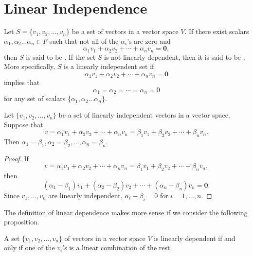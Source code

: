  
\section{Linear Independence}
 

Let $S = \{v_1, v_2, \ldots, v_n\}$ be a set of vectors in a vector
space $V$. If there exist scalars $\alpha_1, \alpha_2 \ldots \alpha_n
\in F$ such that not all of the $\alpha_i$'s are zero and 
\[
\alpha_1 v_1 + \alpha_2 v_2 + \cdots + \alpha_n v_n = {\mathbf 0 },
\]
then $S$ is said to be . If the set $S$ is not linearly
dependent, then it is said to be . More specifically, $S$ is a
linearly independent set if
\[ 
\alpha_1 v_1 + \alpha_2 v_2 + \cdots + \alpha_n v_n = {\mathbf 0 }
\]
implies that
\[
\alpha_1 = \alpha_2 = \cdots = \alpha_n = 0
\]
for any set of scalars $\{ \alpha_1, \alpha_2 \ldots \alpha_n \}$.


 
\begin{proposition}
Let $\{ v_1, v_2, \ldots, v_n \}$ be a set of linearly independent
vectors in a vector space. Suppose that 
\[
v = \alpha_1 v_1 + \alpha_2 v_2 + \cdots + \alpha_n v_n
= \beta_1 v_1 + \beta_2 v_2 + \cdots + \beta_n v_n.
\]
Then $\alpha_1 = \beta_1, \alpha_2 = \beta_2, \ldots, \alpha_n =
\beta_n$. 
\end{proposition}

\begin{proof}
If 
\[
v = \alpha_1 v_1 + \alpha_2 v_2 + \cdots + \alpha_n v_n
= \beta_1 v_1 + \beta_2 v_2 + \cdots + \beta_n v_n,
\]
then
\[
(\alpha_1 - \beta_1) v_1 + (\alpha_2 - \beta_2) v_2 + \cdots +
(\alpha_n - \beta_n) v_n = {\mathbf 0}.
\]
Since $v_1, \ldots, v_n$ are linearly independent, $\alpha_i - \beta_i
=0$ for $i = 1, \ldots, n$.
\end{proof}
 

\medskip


The definition of linear dependence makes more sense if we consider
the following proposition.

 
\begin{proposition}
A set $\{ v_1, v_2, \dots, v_n \}$ of vectors in a vector space $V$ is
linearly dependent if and only if one of the $v_i$'s is a linear
combination of the rest. 
\end{proposition}


